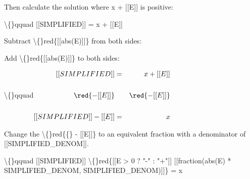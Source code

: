 \documentclass{article}
\begin{document}
\begin{itemize}
                                    Then calculate the solution where
                                    x + [[E]] is positive:
                                
                                \textbackslash\{\}qquad
                                    [[SIMPLIFIED]] = x + [[E]]
                                
                            
                            
                                
                                    Subtract
                                    \textbackslash\{\}red\{[[abs(E)]]\}
                                    from both
                                    sides:
                                
                                    Add
                                    \textbackslash\{\}red\{[[abs(E)]]\}
                                    to both
                                    sides:
                                
                                \textbackslash\{\}qquad$\begin{aligned}
                                    [[SIMPLIFIED]] &=&
                                    x + [[E]] \\ \\
                                    \red{- [[E]]} &&
                                    \red{- [[E]]} \\ \\
                                    [[SIMPLIFIED]] - [[E]]
                                    &=& x
                                    \end{aligned}$
                                
                            
                            
                                
                                    Change the
                                    \textbackslash\{\}red\{\{\} - [[E]]\}
                                    to an equivalent fraction with a
                                    denominator of
                                    [[SIMPLIFIED\_DENOM]].
                                
                                \textbackslash\{\}qquad
                                    [[SIMPLIFIED]]
                                    \textbackslash\{\}red\{[[E > 0 ? "-" : "+"]]
                                    [[fraction(abs(E) * SIMPLIFIED\_DENOM,
                                    SIMPLIFIED\_DENOM)]]\} = x
                                

\end{itemize}
\end{document}
